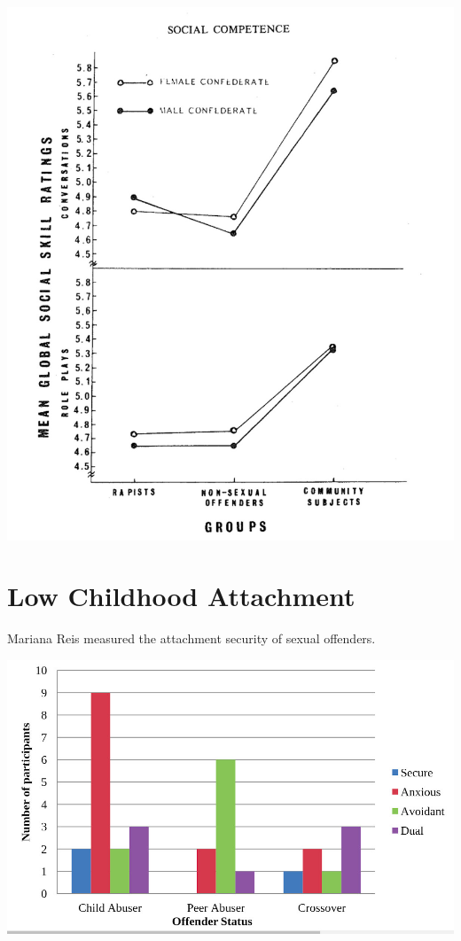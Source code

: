 \documentclass{amsart}
\begin{document}
\includegraphics[scale=0.3]{rapistsocialcomp.jpeg}

\section{Low Childhood Attachment}

Mariana Reis \cite{Reis} measured the attachment security of sexual offenders.

\includegraphics[scale=0.4]{rapistsec.jpeg}
\end{document}
